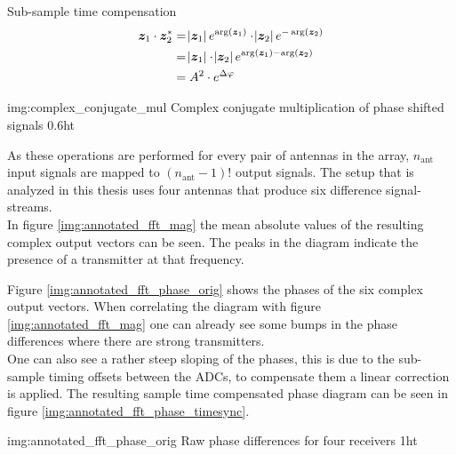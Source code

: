\begin{subchapter}{Sub-sample time compensation}
  \begin{equation}
    \label{eq:multiply_cplx_conj}
    \begin{split}
      \bm{z}_\text{1} \cdot \bm{z}_\text{2}^{\ast}
      & = \abs{\bm{z}_\text{1}} e^{\arg(\bm{z}_\text{1})}
        \cdot
        \abs{\bm{z}_\text{2}} e^{-\arg(\bm{z}_\text{2})} \\
      & = \abs{\bm{z}_\text{1}} \cdot \abs{\bm{z}_\text{2}}
        e^{\arg(\bm{z}_\text{1}) - \arg(\bm{z}_\text{2})} \\
      & = A^{2} \cdot e^{\Delta \varphi}
    \end{split}
  \end{equation}

               {img:complex_conjugate_mul}
               {Complex conjugate multiplication of phase shifted signals}
               {0.6}{ht}

  As these operations are performed for every pair
  of antennas in the array, $n_\text{ant}$ input
  signals are mapped to $\left(n_\text{ant}-1\right)!$
  output signals.
  The setup that is analyzed in this thesis uses
  four antennas that produce six difference signal-streams. \\

  In figure \ref{img:annotated_fft_mag} the mean
  absolute values of the resulting complex output
  vectors can be seen. The peaks in the diagram indicate
  the presence of a transmitter at that frequency.

  Figure \ref{img:annotated_fft_phase_orig} shows the phases
  of the six complex output vectors. When correlating the
  diagram with figure \ref{img:annotated_fft_mag} one can already
  see some bumps in the phase differences where there are strong transmitters. \\

  One can also see a rather steep sloping of the phases,
  this is due to the sub-sample timing offsets between the
  ADCs, to compensate them a linear correction is applied.
  The resulting sample time compensated phase diagram can be seen in
  figure \ref{img:annotated_fft_phase_timesync}.

               {img:annotated_fft_phase_orig}
               {Raw phase differences for four receivers}
               {1}{ht}
\end{subchapter}

